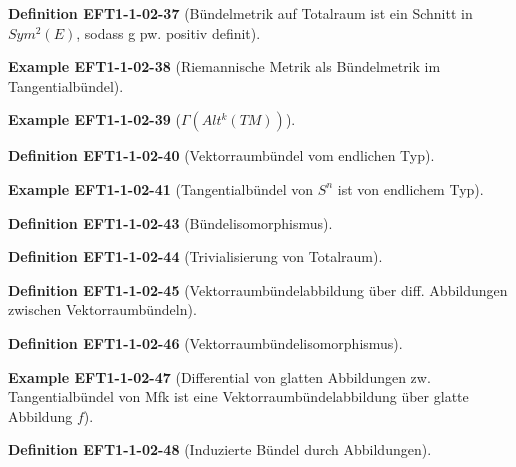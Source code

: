 \documentclass[10pt, letterpaper]{article}
\newcommand{\CustomHeading}[3]{%
  \par\medskip\noindent%
  \textbf{#1 #2} \textnormal{(#3)}.\enskip%
}
\newenvironment{DEF}[2]{\CustomHeading{Definition}{#1}{#2}}{}
\newenvironment{EXA}[2]{\CustomHeading{Example}{#1}{#2}}{}
\begin{document}
\begin{DEF}{EFT1-1-02-37}{Bündelmetrik auf Totalraum ist ein Schnitt in $Sym^2(E)$, sodass g pw. positiv definit}
\end{DEF}

\begin{EXA}{EFT1-1-02-38}{Riemannische Metrik als Bündelmetrik im Tangentialbündel}
\end{EXA}

\begin{EXA}{EFT1-1-02-39}{$\Gamma (Alt^k(TM))$}
\end{EXA}

\begin{DEF}{EFT1-1-02-40}{Vektorraumbündel vom endlichen Typ}
\end{DEF}

\begin{EXA}{EFT1-1-02-41}{Tangentialbündel von $S^n$ ist von endlichem Typ}
\end{EXA}

\begin{DEF}{EFT1-1-02-43}{Bündelisomorphismus}
\end{DEF}

\begin{DEF}{EFT1-1-02-44}{Trivialisierung von Totalraum}
\end{DEF}

\begin{DEF}{EFT1-1-02-45}{Vektorraumbündelabbildung über diff. Abbildungen zwischen Vektorraumbündeln}
\end{DEF}

\begin{DEF}{EFT1-1-02-46}{Vektorraumbündelisomorphismus}
\end{DEF}

\begin{EXA}{EFT1-1-02-47}{Differential von glatten Abbildungen zw. Tangentialbündel von Mfk ist eine Vektorraumbündelabbildung über glatte Abbildung $f$}
\end{EXA}

\begin{DEF}{EFT1-1-02-48}{Induzierte Bündel durch Abbildungen}
\end{DEF}
\end{document}
